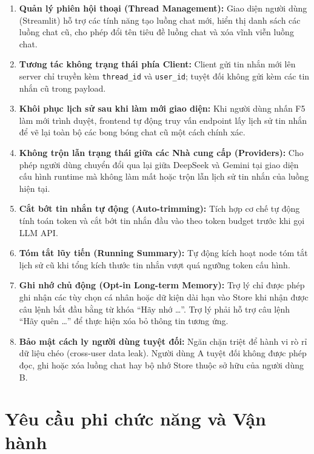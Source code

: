\begin{enumerate}
  \item \textbf{Quản lý phiên hội thoại (Thread Management):} Giao diện người dùng (Streamlit) hỗ trợ các tính năng tạo luồng chat mới, hiển thị danh sách các luồng chat cũ, cho phép đổi tên tiêu đề luồng chat và xóa vĩnh viễn luồng chat.
  \item \textbf{Tương tác không trạng thái phía Client:} Client gửi tin nhắn mới lên server chỉ truyền kèm \texttt{thread\_id} và \texttt{user\_id}; tuyệt đối không gửi kèm các tin nhắn cũ trong payload.
  \item \textbf{Khôi phục lịch sử sau khi làm mới giao diện:} Khi người dùng nhấn F5 làm mới trình duyệt, frontend tự động truy vấn endpoint lấy lịch sử tin nhắn để vẽ lại toàn bộ các bong bóng chat cũ một cách chính xác.
  \item \textbf{Không trộn lẫn trạng thái giữa các Nhà cung cấp (Providers):} Cho phép người dùng chuyển đổi qua lại giữa DeepSeek và Gemini tại giao diện cấu hình runtime mà không làm mất hoặc trộn lẫn lịch sử tin nhắn của luồng hiện tại.
  \item \textbf{Cắt bớt tin nhắn tự động (Auto-trimming):} Tích hợp cơ chế tự động tính toán token và cắt bớt tin nhắn đầu vào theo token budget trước khi gọi LLM API.
  \item \textbf{Tóm tắt lũy tiến (Running Summary):} Tự động kích hoạt node tóm tắt lịch sử cũ khi tổng kích thước tin nhắn vượt quá ngưỡng token cấu hình.
  \item \textbf{Ghi nhớ chủ động (Opt-in Long-term Memory):} Trợ lý chỉ được phép ghi nhận các tùy chọn cá nhân hoặc dữ kiện dài hạn vào Store khi nhận được câu lệnh bắt đầu bằng từ khóa ``Hãy nhớ \dots''. Trợ lý phải hỗ trợ câu lệnh ``Hãy quên \dots'' để thực hiện xóa bỏ thông tin tương ứng.
  \item \textbf{Bảo mật cách ly người dùng tuyệt đối:} Ngăn chặn triệt để hành vi rò rỉ dữ liệu chéo (cross-user data leak). Người dùng A tuyệt đối không được phép đọc, ghi hoặc xóa luồng chat hay bộ nhớ Store thuộc sở hữu của người dùng B.
\end{enumerate}

\section{Yêu cầu phi chức năng và Vận hành}

